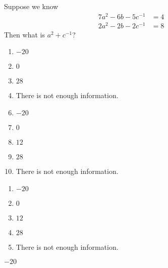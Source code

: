 


  Suppose we know
\begin{align*}
7a^2 - 6b - 5c^{-1} & = 4 \\
2a^2 - 2b - 2c^{-1} & = 8
\end{align*}
Then what is $a^2 + c^{-1}$?


\ifsat
	\begin{enumerate}[label=\Alph*)]
		\item   $-20$ %
		\item  $0$
		\item  $28$
		\item There is not enough information.
	\end{enumerate}
\else
\fi

\ifacteven
	\begin{enumerate}[label=\textbf{\Alph*.},itemsep=\fill,align=left]
		\setcounter{enumii}{5}
		\item   $-20$ %
		\item  $0$
		\item  $12$
		\addtocounter{enumii}{1}
		\item  $28$
		\item There is not enough information.
	\end{enumerate}
\else
\fi

\ifactodd
	\begin{enumerate}[label=\textbf{\Alph*.},itemsep=\fill,align=left]
		\item   $-20$ %
		\item  $0$
		\item  $12$
		\item  $28$
		\item There is not enough information.
	\end{enumerate}
\else
\fi

\ifgridin
   $-20$ %
		
\else
\fi

